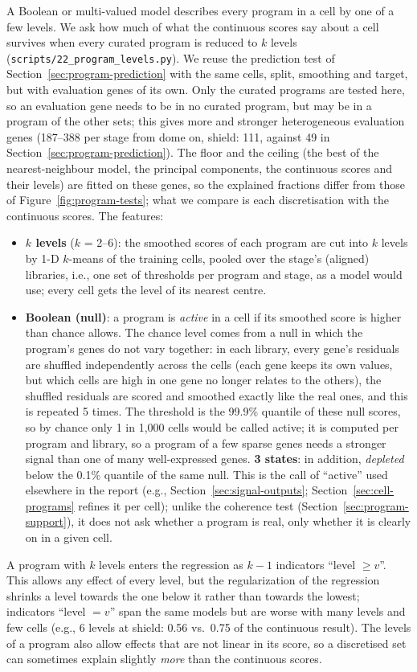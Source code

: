 \documentclass[11pt,a4paper]{article}
\begin{document}
A Boolean or multi-valued model describes every program in a cell by one of a few levels. We ask how much of what the continuous scores say about a cell survives when every curated program is reduced to $k$ levels (\nolinkurl{scripts/22_program_levels.py}). We reuse the prediction test of Section~\ref{sec:program-prediction} with the same cells, split, smoothing and target, but with evaluation genes of its own. Only the curated programs are tested here, so an evaluation gene needs to be in no curated program, but may be in a program of the other sets; this gives more and stronger heterogeneous evaluation genes (187--388 per stage from dome on, shield: 111, against 49 in Section~\ref{sec:program-prediction}). The floor and the ceiling (the best of the nearest-neighbour model, the principal components, the continuous scores and their levels) are fitted on these genes, so the explained fractions differ from those of Figure~\ref{fig:program-tests}; what we compare is each discretisation with the continuous scores. The features:
\begin{itemize}
	\item \textbf{$k$ levels} ($k$ = 2--6): the smoothed scores of each program are cut into $k$ levels by 1-D $k$-means of the training cells, pooled over the stage's (aligned) libraries, i.e., one set of thresholds per program and stage, as a model would use; every cell gets the level of its nearest centre.
	\item \textbf{Boolean (null)}: a program is \emph{active} in a cell if its smoothed score is higher than chance allows. The chance level comes from a null in which the program's genes do not vary together: in each library, every gene's residuals are shuffled independently across the cells (each gene keeps its own values, but which cells are high in one gene no longer relates to the others), the shuffled residuals are scored and smoothed exactly like the real ones, and this is repeated 5 times. The threshold is the 99.9\% quantile of these null scores, so by chance only 1 in 1{,}000 cells would be called active; it is computed per program and library, so a program of a few sparse genes needs a stronger signal than one of many well-expressed genes. \textbf{3 states}: in addition, \emph{depleted} below the 0.1\% quantile of the same null. This is the call of ``active'' used elsewhere in the report (e.g., Section~\ref{sec:signal-outputs}; Section~\ref{sec:cell-programs} refines it per cell); unlike the coherence test (Section~\ref{sec:program-support}), it does not ask whether a program is real, only whether it is clearly on in a given cell.
\end{itemize}
A program with $k$ levels enters the regression as $k-1$ indicators ``level $\geq v$''. This allows any effect of every level, but the regularization of the regression shrinks a level towards the one below it rather than towards the lowest; indicators ``level $= v$'' span the same models but are worse with many levels and few cells (e.g., 6 levels at shield: 0.56 vs.\ 0.75 of the continuous result). The levels of a program also allow effects that are not linear in its score, so a discretised set can sometimes explain slightly \emph{more} than the continuous scores.
\end{document}

